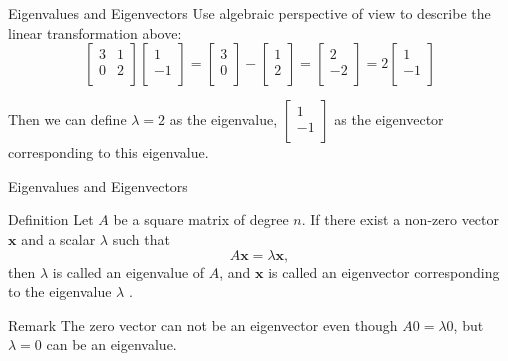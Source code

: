 \documentclass{beamer}
\begin{document}
\begin{frame}{Eigenvalues and Eigenvectors}
Use algebraic perspective of view to describe the linear transformation above:
\begin{equation*}
    \left[ \begin{matrix}
	3&		1\\
	0&		2\\
\end{matrix} \right] \left[ \begin{array}{c}
	1\\
	-1\\
\end{array} \right] =\left[ \begin{array}{c}
	3\\
	0\\
\end{array} \right] -\left[ \begin{array}{c}
	1\\
	2\\
\end{array} \right] =\left[ \begin{array}{c}
	2\\
	-2\\
\end{array} \right] =2\left[ \begin{array}{c}
	1\\
	-1\\
\end{array} \right]
\end{equation*}

Then we can define $\lambda =2$ as the eigenvalue, $\left[ \begin{array}{c}
	1\\
	-1\\
\end{array}\right]$ as the eigenvector corresponding to this eigenvalue.
\end{frame}

\begin{frame}{Eigenvalues and Eigenvectors}
\begin{block}{Definition}
    Let $A$ be a square matrix of degree $n$. If there exist a non-zero vector $\mathbf{x}$ and a scalar $\lambda$ such that
    \begin{equation*}
        A \mathbf{x}=\lambda \mathbf{x},
    \end{equation*}
    then $\lambda$ is called an \alert{eigenvalue} of $A$, and $\mathbf{x}$ is called an \alert{eigenvector} corresponding to the eigenvalue $\lambda$ .
\end{block}
\begin{block}{Remark}
    The zero vector can not be an eigenvector even though $A0=\lambda 0$, but $\lambda=0$ can be an eigenvalue.
\end{block}

\end{frame}
\end{document}

